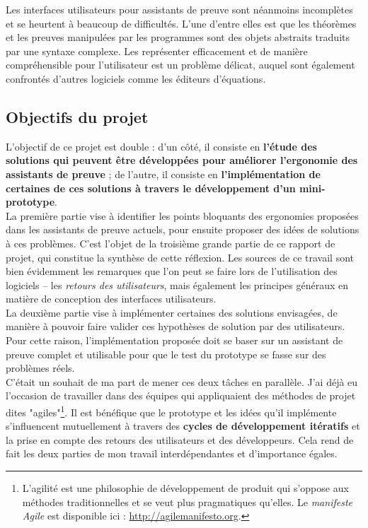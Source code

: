 Les interfaces utilisateurs pour assistants de preuve sont néanmoins incomplètes et se heurtent à beaucoup de difficultés. L'une d'entre elles est que les théorèmes et les preuves manipulées par les programmes sont des objets abstraits traduits par une syntaxe complexe. Les représenter efficacement et de manière compréhensible pour l'utilisateur est un problème délicat, auquel sont également confrontés d'autres logiciels comme les éditeurs d'équations.

\subsection{Objectifs du projet}

L'objectif de ce projet est double : d'un côté, il consiste en \textbf{l'étude des solutions qui peuvent être développées pour améliorer l'ergonomie des assistants de preuve} ; de l'autre, il consiste en \textbf{l'implémentation de certaines de ces solutions à travers le développement d'un mini-prototype}.\\

La première partie vise à identifier les points bloquants des ergonomies proposées dans les assistants de preuve actuels, pour ensuite proposer des idées de solutions à ces problèmes. C'est l'objet de la troisième grande partie de ce rapport de projet, qui constitue la synthèse de cette réflexion. Les sources de ce travail sont bien évidemment les remarques que l'on peut se faire lors de l'utilisation des logiciels -- les \textit{retours des utilisateurs}, mais également les principes généraux en matière de conception des interfaces utilisateurs.\\

La deuxième partie vise à implémenter certaines des solutions envisagées, de manière à pouvoir faire valider ces hypothèses de solution par des utilisateurs. Pour cette raison, l'implémentation proposée doit se baser sur un assistant de preuve complet et utilisable pour que le test du prototype se fasse sur des problèmes réels.\\

C'était un souhait de ma part de mener ces deux tâches en parallèle. J'ai déjà eu l'occasion de travailler dans des équipes qui appliquaient des méthodes de projet dites "agiles"\footnote{L'agilité est une philosophie de développement de produit qui s'oppose aux méthodes traditionnelles et se veut plus pragmatiques qu'elles. Le \textit{manifeste Agile} est disponible ici : \url{http://agilemanifesto.org}.}. Il est bénéfique que le prototype et les idées qu'il implémente s'influencent mutuellement à travers des \textbf{cycles de développement itératifs} et la prise en compte des retours des utilisateurs et des développeurs. Cela rend de fait les deux parties de mon travail interdépendantes et d'importance égales.

